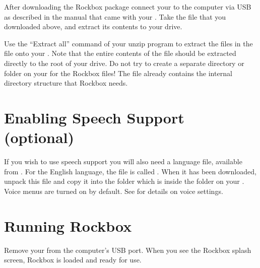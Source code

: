 After downloading the Rockbox package connect your \dap{} to the computer via
USB as described in the manual that came with your \dap{}. Take the file that
you downloaded above, and extract its contents to your \daps{} drive.

Use the ``Extract all'' command of your unzip program to extract the files in
the  file onto your \dap{}. Note that the entire contents of the
 file should be extracted directly to the root of your \daps{}
drive. Do not try to create a separate directory or folder on your \dap{} for
the Rockbox files! The  file already contains the internal
directory structure that Rockbox needs.



\section{Enabling Speech Support (optional)}\label{sec:enabling_speech_support}
If you wish to use speech support you will also need a language file, available
from . For the English language, the file is called
. When it has been downloaded, unpack this file and copy
it into the  folder which is inside the  folder on
your \dap{}. Voice menus are turned on by default. See
 for details on voice settings.

\section{Running Rockbox}
Remove your \dap{} from the computer's USB port.%
%
%
When you see the Rockbox splash screen, Rockbox is loaded and ready for
use.

